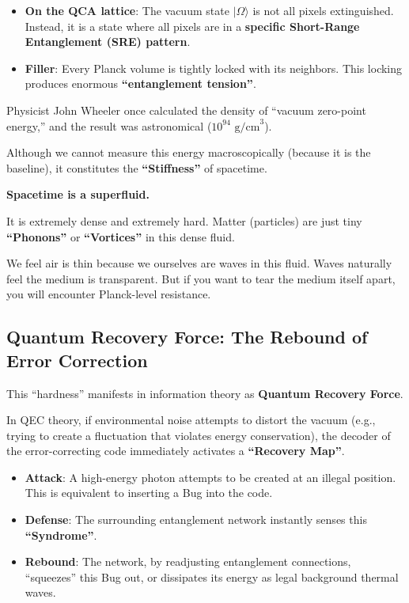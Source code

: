 \begin{itemize}
\item \textbf{On the QCA lattice}: The vacuum state $|\Omega\rangle$ is not all pixels extinguished. Instead, it is a state where all pixels are in a \textbf{specific Short-Range Entanglement (SRE) pattern}.

\item \textbf{Filler}: Every Planck volume is tightly locked with its neighbors. This locking produces enormous \textbf{``entanglement tension''}.
\end{itemize}

Physicist John Wheeler once calculated the density of ``vacuum zero-point energy,'' and the result was astronomical ($10^{94} \text{ g/cm}^3$).

Although we cannot measure this energy macroscopically (because it is the baseline), it constitutes the \textbf{``Stiffness''} of spacetime.

\textbf{Spacetime is a superfluid.}

It is extremely dense and extremely hard. Matter (particles) are just tiny \textbf{``Phonons''} or \textbf{``Vortices''} in this dense fluid.

We feel air is thin because we ourselves are waves in this fluid. Waves naturally feel the medium is transparent. But if you want to tear the medium itself apart, you will encounter Planck-level resistance.

\subsection{Quantum Recovery Force: The Rebound of Error Correction}

This ``hardness'' manifests in information theory as \textbf{Quantum Recovery Force}.

In QEC theory, if environmental noise attempts to distort the vacuum (e.g., trying to create a fluctuation that violates energy conservation), the decoder of the error-correcting code immediately activates a \textbf{``Recovery Map''}.

\begin{itemize}
\item \textbf{Attack}: A high-energy photon attempts to be created at an illegal position. This is equivalent to inserting a Bug into the code.

\item \textbf{Defense}: The surrounding entanglement network instantly senses this \textbf{``Syndrome''}.

\item \textbf{Rebound}: The network, by readjusting entanglement connections, ``squeezes'' this Bug out, or dissipates its energy as legal background thermal waves.
\end{itemize}

